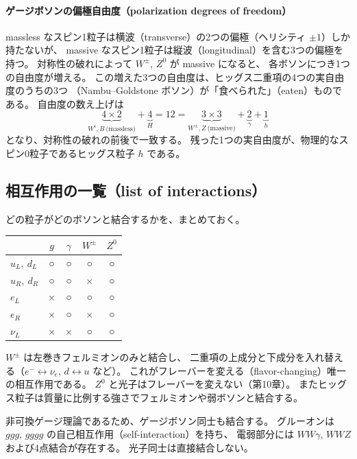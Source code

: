 \documentclass[uplatex,dvipdfmx,a4paper,11pt,openany]{jsbook}
\newcommand{\en}[1]{（#1）}
\numberwithin{equation}{chapter}
\theoremstyle{definition}
\theoremstyle{plain}
\theoremstyle{remark}
\begin{document}
\paragraph{ゲージボソンの偏極自由度（polarization degrees of freedom）}
massless なスピン1粒子は横波\en{transverse}の2つの偏極（ヘリシティ $\pm1$）しか持たないが、
massive なスピン1粒子は縦波\en{longitudinal}を含む3つの偏極を持つ。
対称性の破れによって $W^\pm$, $Z^0$ が massive になると、
各ボソンにつき1つの自由度が増える。
この増えた3つの自由度は、ヒッグス二重項の4つの実自由度のうちの3つ
（Nambu--Goldstone ボソン）が「食べられた」\en{eaten}ものである。
自由度の数え上げは
\begin{equation}
\underbrace{4\times2}_{W^i,B\ \text{(massless)}}
+\underbrace{4}_{H}
=12
=
\underbrace{3\times3}_{W^\pm,Z\ \text{(massive)}}
+\underbrace{2}_{\gamma}
+\underbrace{1}_{h}
\end{equation}
となり、対称性の破れの前後で一致する。
残った1つの実自由度が、物理的なスピン0粒子であるヒッグス粒子 $h$ である。
\subsection{相互作用の一覧（list of interactions）}
どの粒子がどのボソンと結合するかを、まとめておく。
\begin{center}
\renewcommand{\arraystretch}{1.3}
\begin{tabular}{lcccc}
\toprule
 & $g$ & $\gamma$ & $W^\pm$ & $Z^0$\\
\midrule
$u_L,\ d_L$ & ○ & ○ & ○ & ○\\
$u_R,\ d_R$ & ○ & ○ & × & ○\\
$e_L$ & × & ○ & ○ & ○\\
$e_R$ & × & ○ & × & ○\\
$\nu_L$ & × & × & ○ & ○\\
\bottomrule
\end{tabular}
\end{center}
$W^\pm$ は左巻きフェルミオンのみと結合し、
二重項の上成分と下成分を入れ替える（$e^-\leftrightarrow\nu_e$, $d\leftrightarrow u$ など）。
これがフレーバーを変える\en{flavor-changing}唯一の相互作用である。
$Z^0$ と光子はフレーバーを変えない（第10章）。
またヒッグス粒子は質量に比例する強さでフェルミオンや弱ボソンと結合する。

非可換ゲージ理論であるため、ゲージボソン同士も結合する。
グルーオンは $ggg$, $gggg$ の自己相互作用\en{self-interaction}を持ち、
電弱部分には $WW\gamma$, $WWZ$ および4点結合が存在する。
光子同士は直接結合しない。
\end{document}
